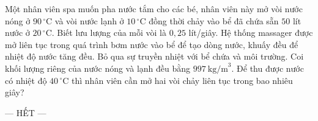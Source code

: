	\begin{ex}%
		Một nhân viên spa muốn pha nước tắm cho các bé, nhân viên này mở vòi nước nóng ở $90\,^\circ\text{C}$ và vòi nước lạnh ở $10\,^\circ\text{C}$ đồng thời chảy vào bể đã chứa sẵn $50$ lít nước ở $20\,^\circ\text{C}$. Biết lưu lượng của mỗi vòi là $0{,}25$ lít/giây. Hệ thống massager được mở liên tục trong quá trình bơm nước vào bể để tạo dòng nước, khuấy đều để nhiệt độ nước tăng đều. Bỏ qua sự truyền nhiệt với bể chứa và môi trường. Coi khối lượng riêng của nước nóng và lạnh đều bằng $997~\text{kg/m}^3$. Để thu được nước có nhiệt độ $40\,^\circ\text{C}$ thì nhân viên cần mở hai vòi chảy liên tục trong bao nhiêu giây?
		\par
	\end{ex}

	\centerline{--- HẾT ---}


